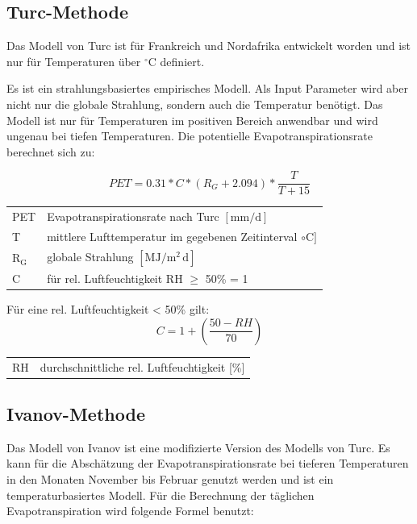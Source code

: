 \subsection{Turc-Methode}
Das Modell von Turc ist für Frankreich und Nordafrika entwickelt worden und ist nur für Temperaturen über $\mathrm{^{\circ}C}$ definiert.

Es ist ein strahlungsbasiertes empirisches Modell. Als Input Parameter wird aber nicht nur die globale Strahlung, sondern auch die Temperatur benötigt. Das Modell ist nur für Temperaturen im positiven Bereich anwendbar und wird ungenau bei tiefen Temperaturen. Die potentielle Evapotranspirationsrate berechnet sich zu:

\begin{equation}
\label{eq:turc}
PET=0.31*C*\left(R_G+2.094\right)*\frac{T}{T+15}
\end{equation}
\begin{table}[H]
\centering
\begin{tabular}{ll}
PET & Evapotranspirationsrate nach Turc  $\mathrm{[mm/d]}$\\
T & mittlere Lufttemperatur im gegebenen Zeitinterval $\mathrm{{\circ}C]}$\\
$\mathrm{R_G}$ & globale Strahlung $\mathrm{[MJ/m^2\,d]}$\\
C & für rel. Luftfeuchtigkeit RH $\geq$ 50\% = 1\\
\end{tabular}
\end{table}
Für eine rel. Luftfeuchtigkeit < 50\% gilt:
\begin{equation}
\label{eq:turc_c}
C=1+\left(\frac{50-RH}{70}\right)
\end{equation}
\begin{table}[H]
\centering
\begin{tabular}{ll}
RH& durchschnittliche rel. Luftfeuchtigkeit [\%]\\
\end{tabular}
\end{table}

\subsection{Ivanov-Methode}
Das Modell von Ivanov ist eine modifizierte Version des Modells von Turc. Es kann für die Abschätzung der Evapotranspirationsrate bei tieferen Temperaturen in den Monaten November bis Februar genutzt werden und ist ein temperaturbasiertes Modell. Für die Berechnung der täglichen Evapotranspiration wird folgende Formel benutzt:

